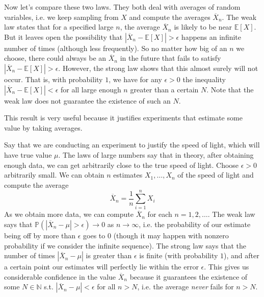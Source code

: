   Now let's compare these two laws. They both deal with averages of random variables, i.e. we keep sampling from $X$ and compute the averages $\overline{X}_n$. The weak law states that for a specified large $n$, the average $\overline{X}_n$ is likely to be near $\mathbb{E}[X]$. But it leaves open the possibility that $|\overline{X}_n - \mathbb{E}[X]| > \epsilon$ happens an infinite number of times (although less frequently). So no matter how big of an $n$ we choose, there could always be an $\overline{X}_n$ in the future that fails to satisfy $|\overline{X}_n - \mathbb{E}[X]| > \epsilon$. However, the strong law shows that this almost surely will not occur. That is, with probability $1$, we have for any $\epsilon > 0$ the inequality $|\overline{X}_n - \mathbb{E}[X]| < \epsilon$ for all large enough $n$ greater than a certain $N$. Note that the weak law does not guarantee the existence of such an $N$. 

  This result is very useful because it justifies experiments that estimate some value by taking averages. 

  \begin{example}
    Say that we are conducting an experiment to justify the speed of light, which will have true value $\mu$. The laws of large numbers say that in theory, after obtaining enough data, we can get arbitrarily close to the true speed of light. Choose $\epsilon > 0$ arbitrarily small. We can obtain $n$ estimates $X_1, \ldots, X_n$ of the speed of light and compute the average 
    \begin{equation}
      \overline{X}_n = \frac{1}{n} \sum_{i=1}^n X_i
    \end{equation}
    As we obtain more data, we can compute $\overline{X}_n$ for each $n = 1, 2, \ldots$. The weak law says that $\mathbb{P}(|\overline{X}_n - \mu| > \epsilon) \rightarrow 0$ as $n \rightarrow \infty$, i.e. the probability of our estimate being off by more than $\epsilon$ goes to $0$ (though it may happen with nonzero probability if we consider the infinite sequence). The strong law says that the number of times $|\overline{X}_n - \mu|$ is greater than $\epsilon$ is finite (with probability $1$), and after a certain point our estimates will perfectly lie within the error $\epsilon$. This gives us considerable confidence in the value $\overline{X}_n$ because it guarantees the existence of some $N \in \mathbb{N}$ s.t. $|\overline{X}_n - \mu| < \epsilon$ for all $n > N$, i.e. the average \textit{never} fails for $n > N$. 
  \end{example}

